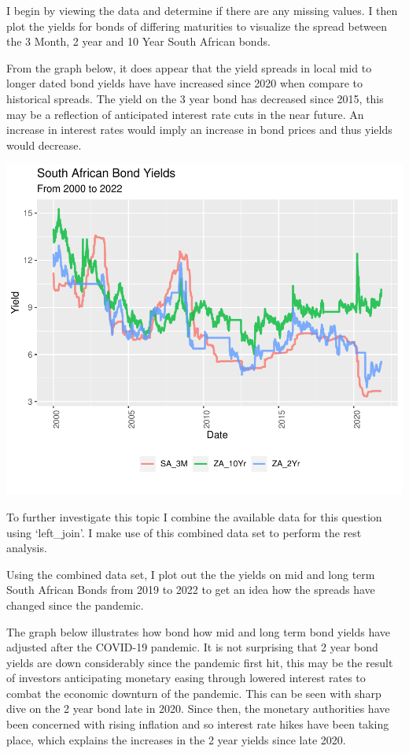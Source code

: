 \documentclass[11pt,preprint, authoryear]{elsarticle}
\numberwithin{equation}{section}
\numberwithin{figure}{section}
\numberwithin{table}{section}
\begin{document}
I begin by viewing the data and determine if there are any missing
values. I then plot the yields for bonds of differing maturities to
visualize the spread between the 3 Month, 2 year and 10 Year South
African bonds.

From the graph below, it does appear that the yield spreads in local mid
to longer dated bond yields have have increased since 2020 when compare
to historical spreads. The yield on the 3 year bond has decreased since
2015, this may be a reflection of anticipated interest rate cuts in the
near future. An increase in interest rates would imply an increase in
bond prices and thus yields would decrease.

\includegraphics{Question2_files/figure-latex/unnamed-chunk-1-1.pdf}

To further investigate this topic I combine the available data for this
question using `left\_join'. I make use of this combined data set to
perform the rest analysis.

Using the combined data set, I plot out the the yields on mid and long
term South African Bonds from 2019 to 2022 to get an idea how the
spreads have changed since the pandemic.

The graph below illustrates how bond how mid and long term bond yields
have adjusted after the COVID-19 pandemic. It is not surprising that 2
year bond yields are down considerably since the pandemic first hit,
this may be the result of investors anticipating monetary easing through
lowered interest rates to combat the economic downturn of the pandemic.
This can be seen with sharp dive on the 2 year bond late in 2020. Since
then, the monetary authorities have been concerned with rising inflation
and so interest rate hikes have been taking place, which explains the
increases in the 2 year yields since late 2020.
\end{document}
